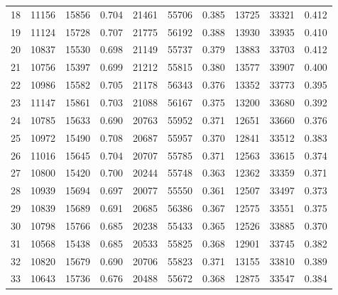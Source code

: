 \begin{table}
\begin{tabular}{c|C{1cm}C{1cm}C{1cm}|C{1cm}C{1cm}C{1cm}|C{1cm}C{1cm}C{1cm}}
18 & 11156 & 15856 & 0.704 & 21461 & 55706 & 0.385 & 13725 & 33321 & 0.412 \\
19 & 11124 & 15728 & 0.707 & 21775 & 56192 & 0.388 & 13930 & 33935 & 0.410 \\
20 & 10837 & 15530 & 0.698 & 21149 & 55737 & 0.379 & 13883 & 33703 & 0.412 \\
21 & 10756 & 15397 & 0.699 & 21212 & 55815 & 0.380 & 13577 & 33907 & 0.400 \\
22 & 10986 & 15582 & 0.705 & 21178 & 56343 & 0.376 & 13352 & 33773 & 0.395 \\
23 & 11147 & 15861 & 0.703 & 21088 & 56167 & 0.375 & 13200 & 33680 & 0.392 \\
24 & 10785 & 15633 & 0.690 & 20763 & 55952 & 0.371 & 12651 & 33660 & 0.376 \\
25 & 10972 & 15490 & 0.708 & 20687 & 55957 & 0.370 & 12841 & 33512 & 0.383 \\
26 & 11016 & 15645 & 0.704 & 20707 & 55785 & 0.371 & 12563 & 33615 & 0.374 \\
27 & 10800 & 15420 & 0.700 & 20244 & 55748 & 0.363 & 12362 & 33359 & 0.371 \\
28 & 10939 & 15694 & 0.697 & 20077 & 55550 & 0.361 & 12507 & 33497 & 0.373 \\
29 & 10839 & 15689 & 0.691 & 20685 & 56386 & 0.367 & 12575 & 33551 & 0.375 \\
30 & 10798 & 15766 & 0.685 & 20238 & 55433 & 0.365 & 12526 & 33885 & 0.370 \\
31 & 10568 & 15438 & 0.685 & 20533 & 55825 & 0.368 & 12901 & 33745 & 0.382 \\
32 & 10820 & 15679 & 0.690 & 20706 & 55823 & 0.371 & 13155 & 33810 & 0.389 \\
33 & 10643 & 15736 & 0.676 & 20488 & 55672 & 0.368 & 12875 & 33547 & 0.384 \\

\end{tabular}
\end{table}
